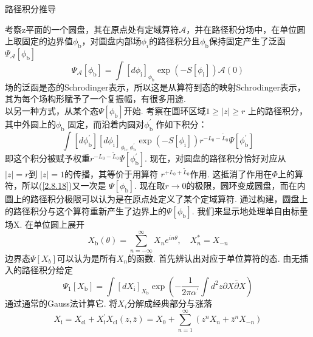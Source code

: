 \centerline{\Large 路径积分推导}
考察z平面的一个圆盘，其在原点处有定域算符$\mathscr{A}$，并在路径积分场中，在单位圆上取固定的边界值$\phi_{\mathrm{b}}$，对圆盘内部场$\phi_i$的路径积分且$\phi_{\mathrm{b}}$保持固定产生了泛函$\Psi_{\mathscr{A}}[\phi_{\mathrm{b}}]$
\begin{equation}
	\Psi_{\mathscr{A}}\left[\phi_{\mathrm{b}}\right]=\int\left[d \phi_{\mathrm{i}}\right]_{\phi_{\mathrm{b}}} \exp \left(-S\left[\phi_{\mathrm{i}}\right]\right) \mathscr{A}(0)
\end{equation}
场的泛函是态的Schrodinger表示，所以这是从算符到态的映射Schrodinger表示，其为每个场构形赋予了一个复振幅，有很多用途.\\
以另一种方式，从某个态$\Psi[\phi_{\mathrm{b}}]$开始. 考察在圆环区域$1 \geq|z| \geq r$ 上的路径积分，其中外圆上的$\phi_{\mathrm{b}}$ 固定，而沿着内圆对$\phi_{\mathrm{b}}^\prime$ 作如下积分：
\begin{equation}\label{2.8.18}
\int\left[d \phi_{\mathrm{b}}^{\prime}\right]\left[d \phi_{\mathrm{i}}\right]_{\phi_{\mathrm{b}}, \phi_{\mathrm{b}}^{\prime}} \exp \left(-S\left[\phi_{\mathrm{i}}\right]\right) r^{-L_{0}-\tilde{L}_{0}} \Psi\left[\phi_{\mathrm{b}}^{\prime}\right]
\end{equation}
即这个积分被赋予权重$r^{-L_{0}-\tilde{L}_{0}} \Psi\left[\phi_{\mathrm{b}}^{\prime}\right]$. 现在，对圆盘的路径积分恰好对应从 $|z|=r$到 $|z|=1$的传播，其等价于用算符 $r^{+L_{0}+\tilde{L}_{0}}$作用. 这抵消了作用在$\Phi$上的算符，所以(\ref{2.8.18})又一次是
$\Psi[\phi_{\mathrm{b}}]$. 现在取$r\to 0$的极限，圆环变成圆盘，而在内圆上的路径积分极限可以认为是在原点处定义了某个定域算符. 通过构建，圆盘上的路径积分与这个算符重新产生了边界上的$\Psi[\phi_{\mathrm{b}}]$. 我们来显示地处理单自由标量场X. 在单位圆上展开
\begin{equation}
X_{\mathrm{b}}(\theta)=\sum_{n=-\infty}^{\infty} X_{n} e^{i n \theta}, \quad X_{n}^{*}=X_{-n}
\end{equation}
边界态$\Psi[X_b]$可以认为是所有$X_n$的函数. 首先辨认出对应于单位算符的态. 由无插入的路径积分给定
\begin{equation}
\Psi_{1}\left[X_{\mathrm{b}}\right]=\int\left[d X_{\mathrm{i}}\right]_{X_{\mathrm{b}}} \exp \left(-\frac{1}{2 \pi \alpha^{\prime}} \int d^{2} z \partial X \bar{\partial} X\right)
\end{equation}
通过通常的Gauss法计算它. 将$X_i$分解成经典部分与涨落
\begin{subequations}
\begin{equation}
X_{\mathrm{i}}=X_{\mathrm{cl}}+X_{\mathrm{i}}^{\prime}
\end{equation}
\begin{equation}
X_{\mathrm{cl}}(z, \bar{z})=X_{0}+\sum_{n=1}^{\infty}\left(z^{n} X_{n}+\bar{z}^{n} X_{-n}\right)
\end{equation}
\end{subequations}
